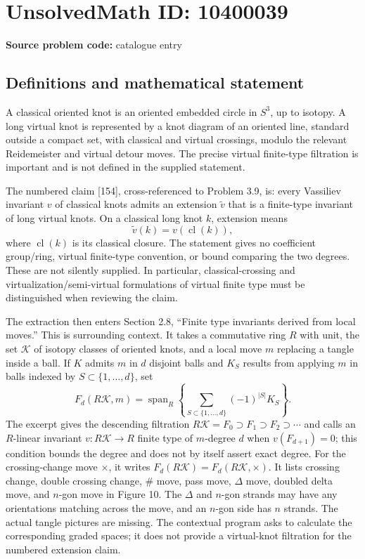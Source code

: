 \documentclass[11pt]{article}
\begin{document}
\section*{UnsolvedMath ID: 10400039}
\textbf{Source problem code:} catalogue entry
\subsection{Definitions and mathematical statement}
A classical oriented knot is an oriented embedded circle in \(S^3\), up to isotopy. A long virtual knot is represented by a knot diagram of an oriented line, standard outside a compact set, with classical and virtual crossings, modulo the relevant Reidemeister and virtual detour moves. The precise virtual finite-type filtration is important and is not defined in the supplied statement.

The numbered claim [154], cross-referenced to Problem 3.9, is: every Vassiliev invariant \(v\) of classical knots admits an extension \(\widetilde v\) that is a finite-type invariant of long virtual knots. On a classical long knot \(k\), extension means
\[
 \widetilde v(k)=v(\operatorname{cl}(k)),
\]
where \(\operatorname{cl}(k)\) is its classical closure. The statement gives no coefficient group/ring, virtual finite-type convention, or bound comparing the two degrees. These are not silently supplied. In particular, classical-crossing and virtualization/semi-virtual formulations of virtual finite type must be distinguished when reviewing the claim.

The extraction then enters Section 2.8, ``Finite type invariants derived from local moves.'' This is surrounding context. It takes a commutative ring \(R\) with unit, the set \(\mathcal K\) of isotopy classes of oriented knots, and a local move \(m\) replacing a tangle inside a ball. If \(K\) admits \(m\) in \(d\) disjoint balls and \(K_S\) results from applying \(m\) in balls indexed by \(S\subset\{1,\ldots,d\}\), set
\[
 F_d(R\mathcal K,m)=\operatorname{span}_R
 \left\{\sum_{S\subset\{1,\ldots,d\}}(-1)^{|S|}K_S\right\}.
 \tag{13}
\]
The excerpt gives the descending filtration \(R\mathcal K=F_0\supset F_1\supset F_2\supset\cdots\) and calls an \(R\)-linear invariant \(v:R\mathcal K\to R\) finite type of \(m\)-degree \(d\) when \(v(F_{d+1})=0\); this condition bounds the degree and does not by itself assert exact degree. For the crossing-change move \(\times\), it writes \(F_d(R\mathcal K)=F_d(R\mathcal K,\times)\). It lists crossing change, double crossing change, \(\#\) move, pass move, \(\Delta\) move, doubled delta move, and \(n\)-gon move in Figure 10. The \(\Delta\) and \(n\)-gon strands may have any orientations matching across the move, and an \(n\)-gon side has \(n\) strands. The actual tangle pictures are missing. The contextual program asks to calculate the corresponding graded spaces; it does not provide a virtual-knot filtration for the numbered extension claim.
\end{document}
